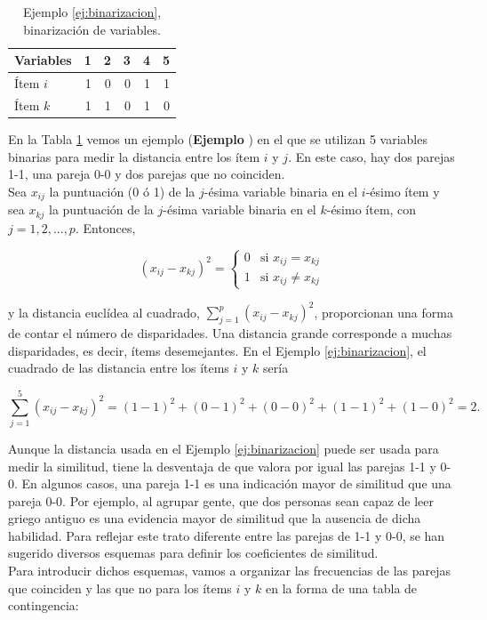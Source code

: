 \documentclass[a4paper, 20pt]{article}
\newcounter{EJCounter}
\newcommand{\ej}[1]{\refstepcounter{EJCounter}\textbf{\rmfamily Ejemplo \theEJCounter}\label{#1}}
\begin{document}
\begin{table}[H]
  \caption{Ejemplo \ref{ej:binarizacion}, binarización de variables.}
  \label{tab:binarizacion}
\centering
  \begin{tabular}{lrrrrr}
    \toprule
  Variables    & 1    & 2    & 3   & 4   & 5   \\
  \midrule
Ítem $i$ & 1    & 0    & 0   & 1   & 1   \\
Ítem $k$ & 1    & 1    & 0   & 1   & 0\\
\bottomrule
\end{tabular}
\end{table}

En la Tabla \ref{tab:binarizacion} vemos un ejemplo (\ej{ej:binarizacion}) en el que se utilizan 5 variables binarias para medir la distancia entre los ítem $i$ y $j$. En este caso, hay dos parejas 1-1, una pareja 0-0 y dos parejas que no coinciden.\\

Sea $x_{ij}$ la puntuación (0 ó 1) de la $j$-ésima variable binaria en el $i$-ésimo ítem y sea $x_{kj}$ la puntuación de la $j$-ésima variable binaria en el $k$-ésimo ítem, con $j=1,2,...,p$. Entonces,

$$(x_{ij}-x_{kj})^2 = \left \{ \begin{matrix} 0 & \mbox{si } x_{ij}=x_{kj}
\\ 1 & \mbox{si }x_{ij}\neq x_{kj}\end{matrix}\right.   $$

y la distancia euclídea al cuadrado, $\sum_{j=1}^p{(x_{ij}-x_{kj})^2}$, proporcionan una forma de contar el número de disparidades. Una distancia grande corresponde a muchas disparidades, es decir, ítems desemejantes. En el Ejemplo \ref{ej:binarizacion}, el cuadrado de las distancia entre los ítems $i$ y $k$ sería

$$\sum_{j=1}^5{(x_{ij}-x_{kj})^2}=(1-1)^2+(0-1)^2+(0-0)^2+(1-1)^2+(1-0)^2=2.$$

Aunque la distancia usada en el Ejemplo \ref{ej:binarizacion} puede ser usada para medir la similitud, tiene la desventaja de que valora por igual las parejas 1-1 y 0-0. En algunos casos, una pareja 1-1 es una indicación mayor de similitud que una pareja 0-0. Por ejemplo, al agrupar gente, que dos personas sean capaz de leer griego antiguo es una evidencia mayor de similitud que la ausencia de dicha habilidad. Para reflejar este trato diferente entre las parejas de 1-1 y 0-0, se han sugerido diversos esquemas para definir los coeficientes de similitud.\\
Para introducir dichos esquemas, vamos a organizar las frecuencias de las parejas que coinciden y las que no para los ítems $i$ y $k$ en la forma de una tabla de contingencia:
\end{document}
